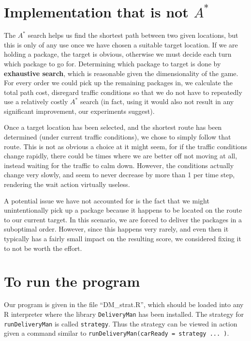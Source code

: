 
      \vspace{3em}
\section{Implementation that is not $A^*$}
        \begingroup
        \setlength{\parskip}{0em}
        The $A^*$ search helps us find the shortest path between two given locations, but this is only of any use once we have chosen a suitable target location. If we are holding a package, the target is obvious, otherwise we must decide each turn which package to go for. Determining which package to target is done by \textbf{exhaustive search}, which is reasonable given the dimensionality of the game. For every order we could pick up the remaining packages in, we calculate the total path cost, disregard traffic conditions so that we do not have to repeatedly use a relatively costly $A^*$ search (in fact, using it would also not result in any significant improvement, our experiments suggest).
        \endgroup



Once a target location has been selected, and the shortest route has been determined (under current traffic conditions), we chose to simply follow that route. This is not as obvious a choice at it might seem, for if the traffic conditions change rapidly, there could be times where we are better off not moving at all, instead waiting for the traffic to calm down. However, the conditions actually change very slowly, and seem to never decrease by more than 1 per time step, rendering the wait action virtually useless.

A potential issue we have not accounted for is the fact that we might unintentionally pick up a package because it happens to be located on the route to our current target. In this scenario, we are forced to deliver the packages in a suboptimal order. However, since this happens very rarely, and even then it typically has a fairly small impact on the resulting score, we considered fixing it to not be worth the effort.


\section{To run the program}

        \begingroup
        \setlength{\parskip}{0em}
Our program is given in the file ``DM\_strat.R'', which should be loaded into any R interpreter where the library \texttt{DeliveryMan} has been installed. The strategy for \texttt{runDeliveryMan} is called \texttt{strategy}. Thus the strategy can be viewed in action given a command similar to \texttt{runDeliveryMan(carReady = strategy ... )}.

\endgroup
